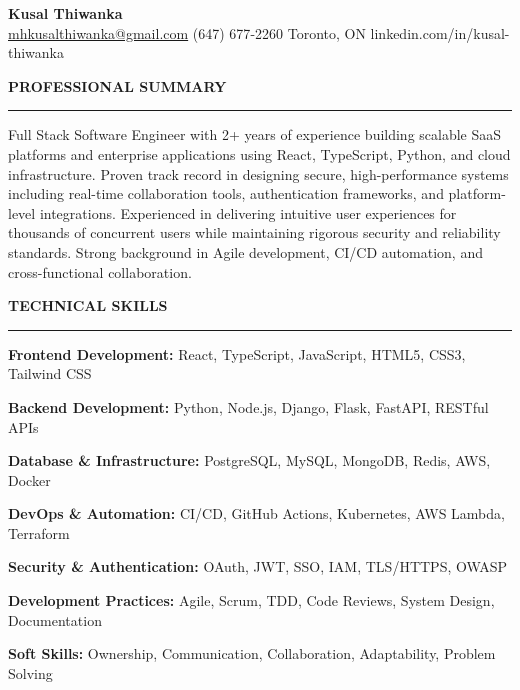 \documentclass[10pt,letterpaper]{article}
\begin{document}
\begin{center}
{\LARGE\textbf{Kusal Thiwanka}}\\[3pt]
\href{mailto:mhkusalthiwanka@gmail.com}{mhkusalthiwanka@gmail.com}\hspace{2em}%
(647) 677{-}2260\hspace{2em}%
Toronto, ON\hspace{2em}
linkedin.com/in/kusal-thiwanka
\end{center}

\vspace{6pt}

\textbf{PROFESSIONAL SUMMARY}\\[-8pt]
\noindent\rule{\textwidth}{1pt}

\vspace{-2pt}

Full Stack Software Engineer with 2+ years of experience building scalable SaaS platforms and enterprise applications using React, TypeScript, Python, and cloud infrastructure. Proven track record in designing secure, high-performance systems including real-time collaboration tools, authentication frameworks, and platform-level integrations. Experienced in delivering intuitive user experiences for thousands of concurrent users while maintaining rigorous security and reliability standards. Strong background in Agile development, CI/CD automation, and cross-functional collaboration.

\vspace{8pt}

\textbf{TECHNICAL SKILLS}\\[-8pt]
\noindent\rule{\textwidth}{1pt}

\vspace{-2pt}

\textbf{Frontend Development:} React, TypeScript, JavaScript, HTML5, CSS3, Tailwind CSS

\textbf{Backend Development:} Python, Node.js, Django, Flask, FastAPI, RESTful APIs

\textbf{Database \& Infrastructure:} PostgreSQL, MySQL, MongoDB, Redis, AWS, Docker

\textbf{DevOps \& Automation:} CI/CD, GitHub Actions, Kubernetes, AWS Lambda, Terraform

\textbf{Security \& Authentication:} OAuth, JWT, SSO, IAM, TLS/HTTPS, OWASP

\textbf{Development Practices:} Agile, Scrum, TDD, Code Reviews, System Design, Documentation

\textbf{Soft Skills:} Ownership, Communication, Collaboration, Adaptability, Problem Solving
\end{document}
